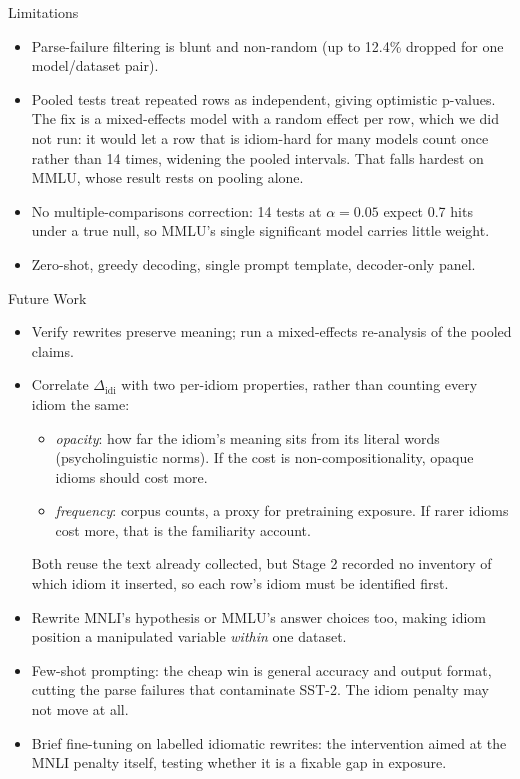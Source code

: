 \documentclass[10pt]{beamer}
\begin{document}
\begin{frame}{Limitations}
  \begin{itemize}
    \item Parse-failure filtering is blunt and non-random (up to 12.4\% dropped
      for one model/dataset pair).
    \item Pooled tests treat repeated rows as independent, giving optimistic
      p-values. The fix is a mixed-effects model with a random effect per row,
      which we did not run: it would let a row that is idiom-hard for many
      models count once rather than 14 times, widening the pooled intervals.
      That falls hardest on MMLU, whose result rests on pooling alone.
    \item No multiple-comparisons correction: 14 tests at $\alpha = 0.05$
      expect 0.7 hits under a true null, so MMLU's single significant model
      carries little weight.
    \item Zero-shot, greedy decoding, single prompt template, decoder-only panel.
  \end{itemize}
\end{frame}

\begin{frame}{Future Work}
  \begin{itemize}
    \item Verify rewrites preserve meaning; run a mixed-effects re-analysis of
      the pooled claims.
    \item Correlate $\Delta_{\text{idi}}$ with two per-idiom properties, rather
      than counting every idiom the same:
      \begin{itemize}
        \item \emph{opacity}: how far the idiom's meaning sits from its
          literal words (psycholinguistic norms). If the cost is
          non-compositionality, opaque idioms should cost more.
        \item \emph{frequency}: corpus counts, a proxy for pretraining
          exposure. If rarer idioms cost more, that is the familiarity account.
      \end{itemize}
      Both reuse the text already collected, but Stage 2 recorded no inventory
      of which idiom it inserted, so each row's idiom must be identified first.
    \item Rewrite MNLI's hypothesis or MMLU's answer choices too, making idiom
      position a manipulated variable \emph{within} one dataset.
    \item Few-shot prompting: the cheap win is general accuracy and output
      format, cutting the parse failures that contaminate SST-2. The idiom
      penalty may not move at all.
    \item Brief fine-tuning on labelled idiomatic rewrites: the intervention
      aimed at the MNLI penalty itself, testing whether it is a fixable gap in
      exposure.
  \end{itemize}
\end{frame}
\end{document}
